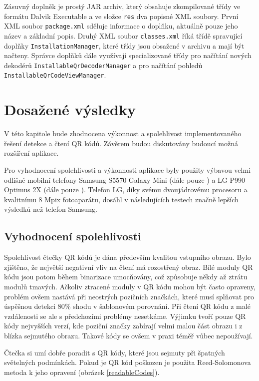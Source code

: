 Zásuvný doplněk je prostý JAR archiv, který obsahuje zkompilované třídy ve
formátu Dalvik Executable a ve složce \texttt{res} dva popisné XML soubory.
První XML soubor \texttt{package.xml} sděluje informace o doplňku, aktuálně pouze jeho
název a základní popis. Druhý XML soubor \texttt{classes.xml} říká třídě
spravující doplňky \texttt{InstallationManager}, které třídy jsou obsažené v
archivu a mají být načteny. Správce doplňků dále využívají specializované třídy
pro načítání nových dekodérů \texttt{InstallableQrDecoderManager} a pro načítání
pohledů \texttt{InstallableQrCodeViewManager}.


\chapter{Dosažené výsledky}
\label{vysledky}

V této kapitole bude zhodnocena výkonnost a spolehlivost implementovaného
řešení detekce a čtení QR kódů. Závěrem budou diskutovány budoucí možná
rozšíření aplikace.

Pro vyhodnocení spolehlivosti a výkonnosti aplikace byly použity výbavou velmi
odlišné mobilní telefony Samsung S5570 Galaxy Mini (dále pouze 
) a LG P990 Optimus 2X (dále pouze ). Telefon LG,
díky svému dvoujádrovému procesoru a kvalitnímu 8 Mpix fotoaparátu, dosáhl v
následujících testech značně lepších výsledků než telefon Samsung.

\section{Vyhodnocení spolehlivosti}

Spolehlivost čtečky QR kódů je dána především kvalitou vstupního obrazu. Bylo
zjištěno, že největší negativní vliv na čtení má rozostřený obraz. Bílé moduly
QR kódu jsou potom během binarizace umocňovány, což způsobuje někdy až ztrátu
modulů tmavých. Ačkoliv ztracené moduly v QR kódu mohou být často opraveny,
problém ovšem nastává při neostrých pozičních značkách, které musí splňovat pro
úspěšnou detekci 80\% shodu v šablonovém porovnání. Při čtení QR kódu z malé
vzdálenosti se ale s předchozími problémy nesetkáme. Výjimku tvoří pouze QR
kódy nejvyšších verzí, kde poziční značky zabírají velmi malou část obrazu i z
blízka sejmutého obrazu. Takové kódy se ovšem v praxi téměř vůbec nepoužívají.

Čtečka si umí dobře poradit s QR kódy, které jsou sejmuty při špatných
světelných podmínkách. Pokud je QR kód poškozen je použita Reed-Solomonova
metoda k jeho opravení (obrázek \ref{readableCodes}).

